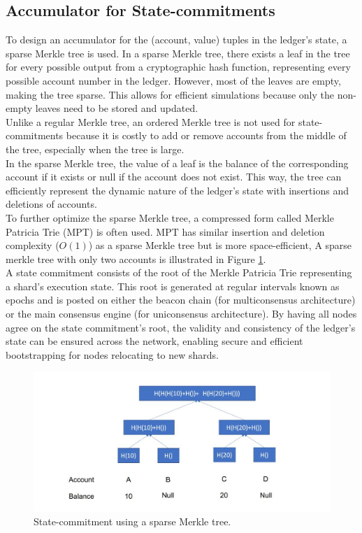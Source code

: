 \documentclass{report}
\begin{document}
\subsection{Accumulator for State-commitments}
To design an accumulator for the (account, value) tuples in the ledger's state, a sparse Merkle tree is used. In a sparse Merkle tree, there exists a leaf in the tree for every possible output from a cryptographic hash function, representing every possible account number in the ledger. However, most of the leaves are empty, making the tree sparse. This allows for efficient simulations because only the non-empty leaves need to be stored and updated.\\
Unlike a regular Merkle tree, an ordered Merkle tree is not used for state-commitments because it is costly to add or remove accounts from the middle of the tree, especially when the tree is large.\\
In the sparse Merkle tree, the value of a leaf is the balance of the corresponding account if it exists or null if the account does not exist. This way, the tree can efficiently represent the dynamic nature of the ledger's state with insertions and deletions of accounts.\\
To further optimize the sparse Merkle tree, a compressed form called Merkle Patricia Trie (MPT) is often used. MPT has similar insertion and deletion complexity ($O(1)$) as a sparse Merkle tree but is more space-efficient, A sparse merkle tree with only two accounts is illustrated in Figure \ref{fig:f4}.\\
A state commitment consists of the root of the Merkle Patricia Trie representing a shard's execution state. This root is generated at regular intervals known as epochs and is posted on either the beacon chain (for multiconsensus architecture) or the main consensus engine (for uniconsensus architecture). By having all nodes agree on the state commitment's root, the validity and consistency of the ledger's state can be ensured across the network, enabling secure and efficient bootstrapping for nodes relocating to new shards.
\begin{center}
	\begin{figure}
		\centering
		\includegraphics[width=0.8\linewidth]{Fig/F4}
		\caption{State-commitment using a sparse Merkle tree.}
		\label{fig:f4}
	\end{figure}
\end{center}
\end{document}
